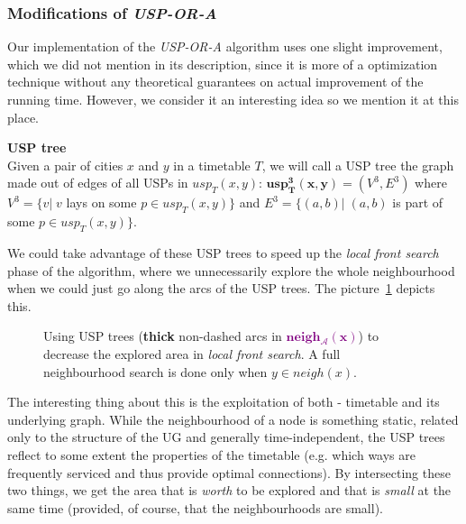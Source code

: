 	\subsubsection{Modifications of \textit{USP-OR-A}}
	
		\noindent Our implementation of the \textit{USP-OR-A} algorithm uses one slight improvement, which we did not mention in its description, since it is more of a optimization technique without any theoretical guarantees on actual improvement of the running time. However, we consider it an interesting idea so we mention it at this place.
		
		\begin{definition}
	        \textbf{USP tree} \\
			Given a pair of cities $x$ and $y$ in a timetable $T$, we will call a USP tree the graph made out of edges of all USPs in $usp_{T}(x, y)$: $\bm{usp^{3}_{T}(x, y)} = (V^{3}, E^{3})$ where $V^{3} = \{v| \; v$ lays on some $p \in usp_{T}(x, y)\}$ and $E^{3} = \{(a, b)| \; (a, b)$ is part of some $p \in usp_{T}(x, y)\}$.
	    \end{definition}
	    
	    \noindent We could take advantage of these USP trees to speed up the \textit{local front search} phase of the algorithm, where we unnecessarily explore the whole neighbourhood when we could just go along the arcs of the USP trees. The picture~\ref{fig:uspora3} depicts this. 
		
		\begin{figure}[h!]
			\begin{center}
			\end{center}
			\caption{\label{fig:uspora3} Using USP trees (\textbf{thick} non-dashed arcs in \textcolor{purple}{$\bm{neigh_{\mathcal{A}}(x)}$}) to decrease the explored area in \textit{local front search}. A full neighbourhood search is done only when $y \in neigh(x)$.}
		\end{figure}
		
		\noindent The interesting thing about this is the exploitation of both - timetable and its underlying graph. While the neighbourhood of a node is something static, related only to the structure of the UG and generally time-independent, the USP trees reflect to some extent the properties of the timetable (e.g. which ways are frequently serviced and thus provide optimal connections). By intersecting these two things, we get the area that is \textit{worth} to be explored and that is \textit{small} at the same time (provided, of course, that the neighbourhoods are small).	    
	 

